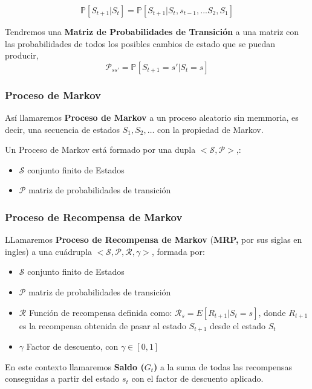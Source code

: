 \documentclass[
  a4paper,
  DIV=11,
  numbers=noendperiod]{scrreprt}
\providecommand{\tightlist}{%
  \setlength{\itemsep}{0pt}\setlength{\parskip}{0pt}}\usepackage{longtable,booktabs,array}
\begin{document}
\[
\mathbb P[S_{t+1}| S_t] = \mathbb P[ S_{t+1}| S_t, s_{t-1}, ... S_2, S_1]
\]

Tendremos una \textbf{Matriz de Probabilidades de Transición} a una
matriz con las probabilidades de todos los posibles cambios de estado
que se puedan producir,
\[\mathcal P_{ss'}=\mathbb P[S_{t+1}=s'|S_t = s]\]

\subsubsection{Proceso de Markov}\label{proceso-de-markov}

Así llamaremos \textbf{Proceso de Markov} a un proceso aleatorio sin
memmoria, es decir, una secuencia de estados \(S_1, S_2, …\) con la
propiedad de Markov.

Un Proceso de Markov está formado por una dupla
\(<\mathcal S,\mathcal P>\),:

\begin{itemize}
\tightlist
\item
  \(\mathcal S\) conjunto finito de Estados
\item
  \(\mathcal P\) matriz de probabilidades de transición
\end{itemize}

\subsubsection{Proceso de Recompensa de
Markov}\label{proceso-de-recompensa-de-markov}

LLamaremos \textbf{Proceso de Recompensa de Markov} (\textbf{MRP,} por
sus siglas en ingles) a una cuádrupla
\(<\mathcal S,\mathcal P,\mathcal R,\gamma>\), formada por:

\begin{itemize}
\tightlist
\item
  \(\mathcal S\) conjunto finito de Estados
\item
  \(\mathcal P\) matriz de probabilidades de transición
\item
  \(\mathcal R\) Función de recompensa definida como:
  \(\mathcal R_s=E[R_{t+1}|S_t=s]\), donde \(R_{t+1}\)es la recompensa
  obtenida de pasar al estado \(S_{t+1}\) desde el estado \(S_t\)
\item
  \(\gamma\) Factor de descuento, con \(\gamma \in [0,1]\)
\end{itemize}

En este contexto llamaremos \textbf{Saldo (}\(G_t\)\textbf{)} a la suma
de todas las recompensas conseguidas a partir del estado \(s_t\) con el
factor de descuento aplicado.
\end{document}
